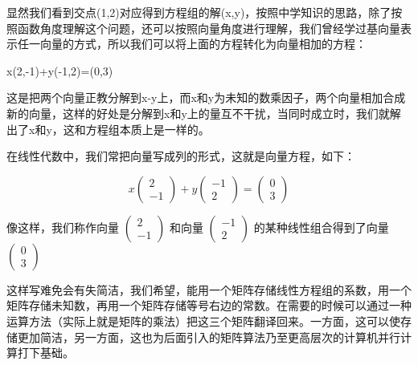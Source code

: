 \documentclass[12pt,a4paper]{book}
\begin{document}
显然我们看到交点(1,2)对应得到方程组的解(x,y)，按照中学知识的思路，除了按照函数角度理解这个问题，还可以按照向量角度进行理解，我们曾经学过基向量表示任一向量的方式，所以我们可以将上面的方程转化为向量相加的方程：

\begin{center}
x(2,-1)+y(-1,2)=(0,3)
\end{center}

这是把两个向量正教分解到x-y上，而x和y为未知的数乘因子，两个向量相加合成新的向量，这样的好处是分解到x和y上的量互不干扰，当同时成立时，我们就解出了x和y，这和方程组本质上是一样的。

在线性代数中，我们常把向量写成列的形式，这就是向量方程，如下：

\[
x
\begin{pmatrix}
2\\
-1
\end{pmatrix}
+y
\begin{pmatrix}
-1\\
2
\end{pmatrix}
=
\begin{pmatrix}
0\\
3
\end{pmatrix}
\]

像这样，我们称作向量
$\begin{pmatrix}
2\\
-1
\end{pmatrix}$
和向量
$\begin{pmatrix}
-1\\
2
\end{pmatrix}$
的某种线性组合得到了向量
$\begin{pmatrix}
0\\
3
\end{pmatrix}$

\vspace{10pt}

这样写难免会有失简洁，我们希望，能用一个矩阵存储线性方程组的系数，用一个矩阵存储未知数，再用一个矩阵存储等号右边的常数。在需要的时候可以通过一种运算方法（实际上就是矩阵的乘法）把这三个矩阵翻译回来。一方面，这可以使存储更加简洁，另一方面，这也为后面引入的矩阵算法乃至更高层次的计算机并行计算打下基础。



{\subsection{\centering\fontsize{20pt}{20pt}}}
\end{document}
